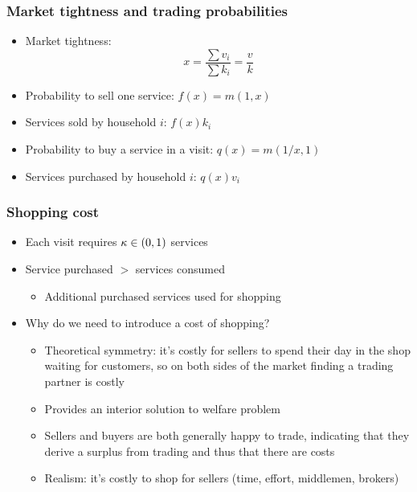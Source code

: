 \documentclass[11pt,aspectratio=169,xcolor={dvipsnames},hyperref={pdftex,pdfpagemode=UseNone,hidelinks,pdfdisplaydoctitle=true},usepdftitle=false]{beamer}
\begin{document}
\begin{frame}
\frametitle{Market tightness and trading probabilities}
\begin{itemize}
\item Market tightness:
\begin{equation*}
x = \frac{\sum v_i}{\sum k_i} = \frac{v}{k}
\end{equation*}
\item Probability to sell one service: $f(x) = m(1,x)$
\item Services sold by household $i$: $f(x) k_i$
\item Probability to buy a service in a visit: $q(x) = m(1/x,1)$
\item Services purchased by household $i$: $q(x) v_i$
\end{itemize}	
\end{frame}

\begin{frame}
\frametitle{Shopping cost}
\begin{itemize}
\item Each visit requires $\kappa\in(0,1)$ services
\item Service purchased $>$ services consumed
\begin{itemize}
	\item Additional purchased services used for shopping
\end{itemize}
\item Why do we need to introduce a cost of shopping?
\begin{itemize}
	\item Theoretical symmetry: it's costly for sellers to spend their day in the shop waiting for customers, so on both sides of the market finding a trading partner is costly
	\item Provides an interior solution to welfare problem
	\item Sellers and buyers are both generally happy to trade, indicating that they derive a surplus from trading and thus that there are costs
	\item Realism: it's costly to shop for sellers (time, effort, middlemen, brokers)
\end{itemize}
\end{itemize}
\end{frame}
\end{document}
